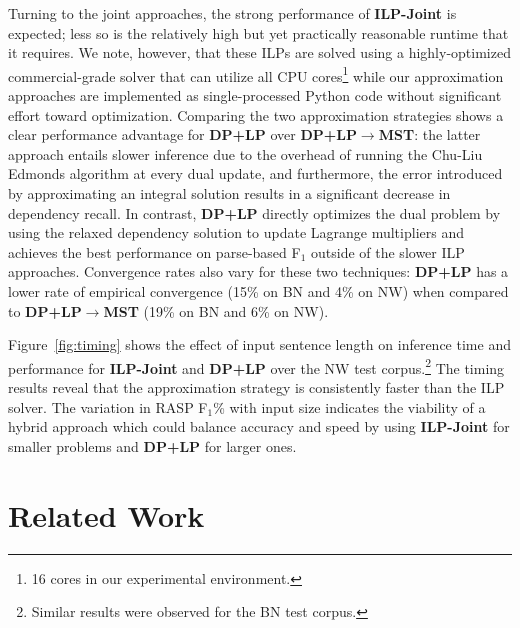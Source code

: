 \documentclass[11pt,a4paper]{article}
\begin{document}
Turning to the joint approaches, the strong performance of \textbf{ILP-Joint}
is expected; less so is the
relatively high but yet practically reasonable runtime that it requires.
We note, however, that these ILPs are solved using a highly-optimized
commercial-grade solver that can utilize all CPU cores\footnote{16 cores in our experimental
    environment.} while our approximation approaches are implemented as
single-processed Python code without significant effort toward optimization.
Comparing the two approximation strategies shows a clear performance
advantage for \textbf{DP+LP} over \textbf{DP+LP$\rightarrow$MST}: the
latter approach entails slower inference due to the overhead of running
the Chu-Liu Edmonds algorithm at every dual update, and furthermore, the
error introduced by approximating an integral solution results in
a significant decrease in dependency recall.
In contrast, \textbf{DP+LP} directly optimizes the dual problem
by using the relaxed dependency solution to update Lagrange multipliers
and achieves the best performance on parse-based F$_1$
outside of the slower ILP approaches.
Convergence rates
also vary for these two techniques: \textbf{DP+LP} has a lower rate
of empirical convergence (15\% on BN and 4\% on NW) when compared to
\textbf{DP+LP$\rightarrow$MST} (19\% on BN and 6\% on NW).

Figure~\ref{fig:timing} shows the effect of input sentence length on inference
time and performance for \textbf{ILP-Joint} and \textbf{DP+LP} over the
NW test corpus.\footnote{Similar results were observed for the BN test corpus.}
The timing results reveal that the approximation strategy is consistently
faster than the ILP solver.
The variation in RASP F$_1$\% with input size
indicates the viability of a hybrid approach which could balance accuracy
and speed by using
\textbf{ILP-Joint} for smaller problems and \textbf{DP+LP} for larger ones.



\section{Related Work}
\label{related}
\end{document}
